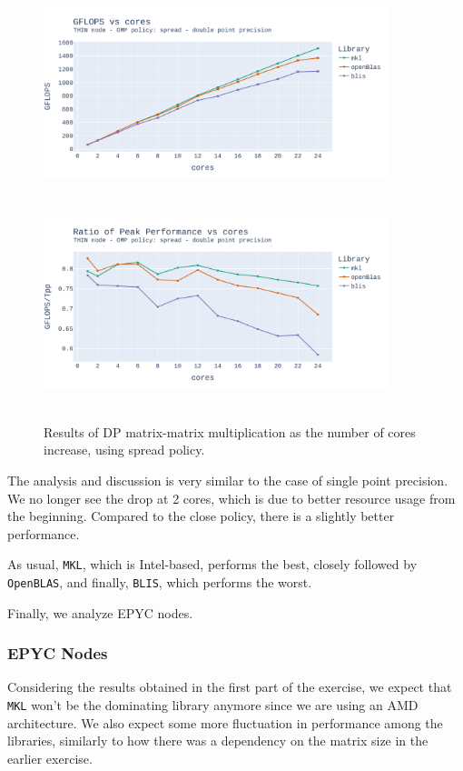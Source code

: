 \documentclass{report}
\begin{document}
\begin{figure}[H]
\hspace*{-2.5cm}
\includegraphics[width=10cm, height=6cm]{./images/fixed_size_thin_double_gflops_spread.pdf}
\includegraphics[width=10cm, height=6cm]{./images/fixed_size_thin_double_gflops_spread_ratio.pdf}
\caption{\label{fig:fixed_size_thin_double_spread} Results of DP matrix-matrix multiplication 
as the number of cores increase, using spread policy.}
\end{figure}

The analysis and discussion is very similar to the case of single point precision. 
We no longer see the drop at 2 cores, which is due to better resource usage from 
the beginning. Compared to the close policy, there is a slightly better performance.

As usual, \texttt{MKL}, which is Intel-based, performs the best, 
closely followed by \texttt{OpenBLAS}, and finally, \texttt{BLIS}, which performs the worst. 

Finally, we analyze EPYC nodes.

\subsubsection{EPYC Nodes}

Considering the results obtained in the first part of the exercise, we expect 
that \texttt{MKL} won't be the dominating library anymore since we are using 
an AMD architecture. We also expect some more fluctuation in performance among 
the libraries, similarly to how there was a dependency on the matrix size in the 
earlier exercise. 
\end{document}
